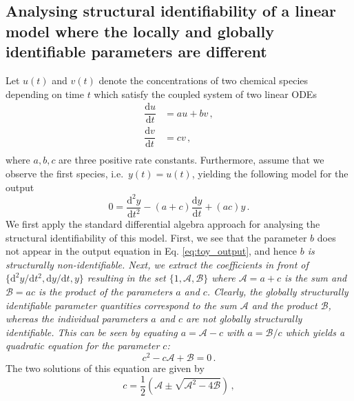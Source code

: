 \documentclass[12pt]{article}
\begin{document}

\subsection{Analysing structural identifiability of a linear model where the locally and globally identifiable parameters are different}

{
Let $u(t)$ and $v(t)$ denote the concentrations of two chemical species depending on time $t$ which satisfy the coupled system of two linear ODEs
\begin{equation}
  \begin{split}
    \dfrac{\mathrm{d}u}{\mathrm{d}t}&=au+bv\,,\\
    \dfrac{\mathrm{d}v}{\mathrm{d}t}&=cv\,,\\
  \end{split}
   \label{eq:toy}
 \end{equation}
where $a,b,c$ are three positive rate constants. Furthermore, assume that we observe the first species, i.e.~$y(t)=u(t)$, yielding the following model for the output
 \begin{equation}
   0=\dfrac{\mathrm{d}^{2}y}{\mathrm{d}t^{2}}-(a+c)\dfrac{\mathrm{d}y}{\mathrm{d}t}+(ac)y\,.
   \label{eq:toy_output}
 \end{equation}
 We first apply the standard differential algebra approach for analysing the structural identifiability of this model. First, we see that the parameter $b$ does not appear in the output equation in Eq. \eqref{eq:toy_output}, and hence \textit{$b$ is structurally non-identifiable. Next, we extract the coefficients in front of $\{\mathrm{d}^{2}y/\mathrm{d}t^{2},\mathrm{d}y/\mathrm{d}t,y\}$ resulting in the set $\{1,\mathcal{A},\mathcal{B}\}$ where $\mathcal{A}=a+c$ is the sum and $\mathcal{B}=ac$ is the product of the parameters $a$ and $c$. Clearly, the globally structurally identifiable parameter quantities correspond to the sum $\mathcal{A}$ and the product $\mathcal{B}$, whereas the individual parameters $a$ and $c$ are not globally structurally identifiable. This can be seen by equating $a=\mathcal{A}-c$ with $a=\mathcal{B}/c$ which yields a quadratic equation for the parameter $c$:}
\begin{equation}
  c^{2}-c\mathcal{A}+\mathcal{B}=0\,.
  \label{eq:quadratic_c}
  \end{equation}
  The two solutions of this equation are given by
  \begin{equation}
    c=\frac{1}{2}\left(\mathcal{A}\pm\sqrt{\mathcal{A}^{2}-4\mathcal{B}}\right)\,,

\end{equation}}
\end{document}
